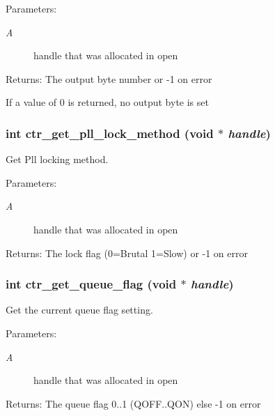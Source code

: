 \begin{Desc}
\item[Parameters:]
\begin{description}
\item[{\em A}]handle that was allocated in open \end{description}
\end{Desc}
\begin{Desc}
\item[Returns:]The output byte number or -1 on error\end{Desc}
If a value of 0 is returned, no output byte is set 
\subsubsection{\setlength{\rightskip}{0pt plus 5cm}int ctr\_\-get\_\-pll\_\-lock\_\-method (void $\ast$ {\em handle})}\label{libctr_8doxygen_8c895f43fe616b4765b695a4184f055a}


Get Pll locking method. 

\begin{Desc}
\item[Parameters:]
\begin{description}
\item[{\em A}]handle that was allocated in open \end{description}
\end{Desc}
\begin{Desc}
\item[Returns:]The lock flag (0=Brutal 1=Slow) or -1 on error \end{Desc}
\subsubsection{\setlength{\rightskip}{0pt plus 5cm}int ctr\_\-get\_\-queue\_\-flag (void $\ast$ {\em handle})}\label{libctr_8doxygen_992c00ab46898ecc288914ceb849bf31}


Get the current queue flag setting. 

\begin{Desc}
\item[Parameters:]
\begin{description}
\item[{\em A}]handle that was allocated in open \end{description}
\end{Desc}
\begin{Desc}
\item[Returns:]The queue flag 0..1 (QOFF..QON) else -1 on error \end{Desc}

